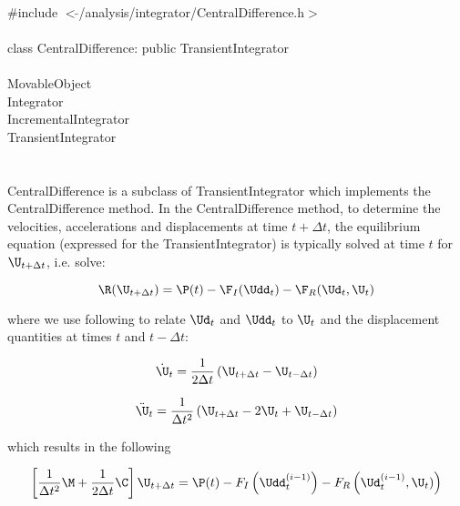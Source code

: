 
   \\
\indent \#include $<\tilde{ }$/analysis/integrator/CentralDifference.h$>$  \\

  \\
\indent class CentralDifference: public TransientIntegrator  \\

 \\
\indent MovableObject \\
\indent\indent Integrator \\
\indent\indent\indent IncrementalIntegrator \\
\indent\indent\indent\indent TransientIntegrator \\
\indent\indent\indent\indent{} \\

 \\ 
\indent CentralDifference is a subclass of TransientIntegrator which implements
the CentralDifference method. In the CentralDifference method, to determine the
velocities, accelerations and displacements at time $t + \Delta t$,
the equilibrium equation (expressed for the TransientIntegrator) is
typically solved at time $t$ for $\U_{t+\Delta t}$, i.e. solve: 

\[ \R (\U_{t+ \Delta t}) = \P(t) - \F_I(\Udd_{t})
- \F_R(\Ud_{t},\U_{t}) \]

\noindent where we use following to relate $\Ud_{t}$ and $\Udd_{t}$ to
$\U_{t}$ and the displacement quantities at times $t$ and $t - \Delta
t$: 

\[
\dot \U_{t} = \frac{1}{2 \Delta t} \left(
\U_{t + \Delta t} -  \U_{t - \Delta t} \right)
\]

\[
\ddot \U_{t} = \frac{1}{\Delta t^2} \left(
\U_{t + \Delta t} - 2 \U_t + \U_{t - \Delta t}\right)
\]


\noindent which results in the following 

\[ \left[ \frac{1}{\Delta t^2} \M + \frac{1}{2 \Delta t}
\C \right] \U_{t + \Delta t} = \P(t) - F_I \left(\Udd_t^{(i-1)}
\right)
-F_R\left( \Ud_t^{(i-1)}, \U_t)\right) \]
\\

